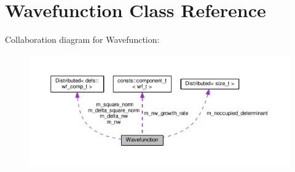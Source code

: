 \hypertarget{classWavefunction}{}\section{Wavefunction Class Reference}
\label{classWavefunction}


Collaboration diagram for Wavefunction\+:\nopagebreak
\begin{figure}[H]
\begin{center}
\leavevmode
\includegraphics[width=350pt]{classWavefunction__coll__graph}
\end{center}
\end{figure}
